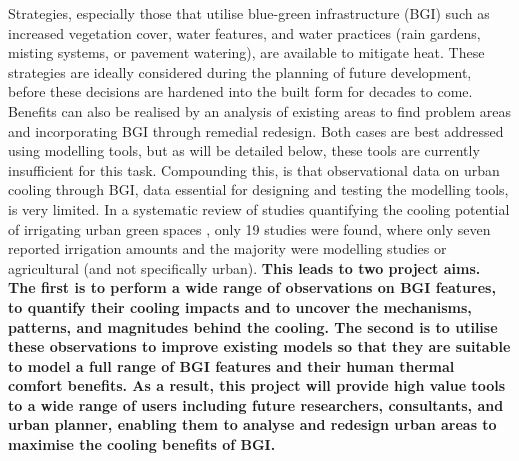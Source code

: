 Strategies, especially those that utilise blue-green infrastructure (BGI)\cite{Norton2015,Bowler2010,Gunawardena2017,Newton2020} such as increased vegetation cover, water features, and water practices (rain gardens, misting systems, or pavement watering), are available to mitigate heat. These strategies are ideally considered during the planning of future development, before these decisions are hardened into the built form for decades to come. Benefits can also be realised by an analysis of existing areas to find problem areas and incorporating BGI through remedial redesign. Both cases are best addressed using modelling tools, but as will be detailed below, these tools are currently insufficient for this task. Compounding this, is that observational data on urban cooling through BGI, data essential for designing and testing the modelling tools, is very limited. In a systematic review of studies quantifying the cooling potential of irrigating urban green spaces \cite{Cheung2021}, only 19 studies were found, where only seven reported irrigation amounts and the majority were modelling studies or agricultural (and not specifically urban). \textbf{This leads to two project aims. The first is to perform a wide range of observations on BGI features, to quantify their cooling impacts and to uncover the mechanisms, patterns, and magnitudes behind the cooling. The second is to utilise these observations to improve existing models so that they are suitable to model a full range of BGI features and their human thermal comfort benefits. As a result, this project will provide high value tools to a wide range of users including future researchers, consultants, and urban planner, enabling them to analyse and redesign urban areas to maximise the cooling benefits of BGI.}




 


